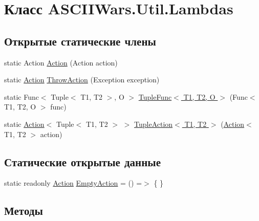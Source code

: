 \hypertarget{class_a_s_c_i_i_wars_1_1_util_1_1_lambdas}{}\section{Класс A\+S\+C\+I\+I\+Wars.\+Util.\+Lambdas}
\label{class_a_s_c_i_i_wars_1_1_util_1_1_lambdas}
\subsection*{Открытые статические члены}
\begin{DoxyCompactItemize}
\item 
static Action \hyperlink{class_a_s_c_i_i_wars_1_1_util_1_1_lambdas_a4bc80215a9cdc6519f88d7d73ef0a2d9}{Action} (Action action)
\item 
static \hyperlink{class_a_s_c_i_i_wars_1_1_util_1_1_lambdas_a4bc80215a9cdc6519f88d7d73ef0a2d9}{Action} \hyperlink{class_a_s_c_i_i_wars_1_1_util_1_1_lambdas_afaafdd8601527db1adaf5877569bbf27}{Throw\+Action} (Exception exception)
\item 
static Func$<$ Tuple$<$ T1, T2 $>$, O $>$ \hyperlink{class_a_s_c_i_i_wars_1_1_util_1_1_lambdas_a99f022c2c1ad621c89644afac676c722}{Tuple\+Func$<$ T1, T2, O $>$} (Func$<$ T1, T2, O $>$ func)
\item 
static \hyperlink{class_a_s_c_i_i_wars_1_1_util_1_1_lambdas_a4bc80215a9cdc6519f88d7d73ef0a2d9}{Action}$<$ Tuple$<$ T1, T2 $>$ $>$ \hyperlink{class_a_s_c_i_i_wars_1_1_util_1_1_lambdas_adbf41b3baf907a23c8676e72bbb53a63}{Tuple\+Action$<$ T1, T2 $>$} (\hyperlink{class_a_s_c_i_i_wars_1_1_util_1_1_lambdas_a4bc80215a9cdc6519f88d7d73ef0a2d9}{Action}$<$ T1, T2 $>$ action)
\end{DoxyCompactItemize}
\subsection*{Статические открытые данные}
\begin{DoxyCompactItemize}
\item 
static readonly \hyperlink{class_a_s_c_i_i_wars_1_1_util_1_1_lambdas_a4bc80215a9cdc6519f88d7d73ef0a2d9}{Action} \hyperlink{class_a_s_c_i_i_wars_1_1_util_1_1_lambdas_aab7ecf777227e68d10c96568758f6782}{Empty\+Action} = () =$>$ \{ \}
\end{DoxyCompactItemize}


\subsection{Методы}
\hypertarget{class_a_s_c_i_i_wars_1_1_util_1_1_lambdas_a4bc80215a9cdc6519f88d7d73ef0a2d9}{}\label{class_a_s_c_i_i_wars_1_1_util_1_1_lambdas_a4bc80215a9cdc6519f88d7d73ef0a2d9} 
